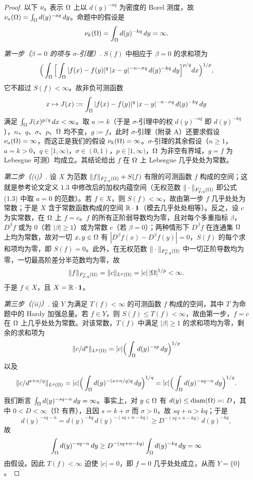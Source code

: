 \begin{proof}
以下 $\nu_{a}$ 表示 $\Omega$ 上以 $d(y)^{-aq}$ 为密度的 Borel 测度，故 $\nu_{a}(\Omega)=\int_\Omega d(y)^{-aq}\,dy$。命题中的假设是
\[
  \nu_k(\Omega)=\int_\Omega d(y)^{-kq}\,dy=\infty .
\]

\emph{第一步（$\beta=0$ 的项与 $\sigma$-引理）}. $S(f)$ 中相应于 $\beta=0$ 的求和项为
\[
  \Big(\int_\Omega\Big[\int_\Omega |f(x)-f(y)|^q\,|x-y|^{-n-\sigma q}\,d(y)^{-kq}\,dy\Big]^{p/q}dx\Big)^{1/p},
\]
它不超过 $S(f)<\infty$。故非负可测函数
\[
  x\mapsto J(x):=\int_\Omega |f(x)-f(y)|^q\,|x-y|^{-n-\sigma q}\,d(y)^{-kq}\,dy
\]
满足 $\int_\Omega J(x)^{p/q}\,dx<\infty$。取 $a:=k$（于是 $\sigma$-引理中的权 $d(y)^{-aq}$ 即 $d(y)^{-kq}$），$n$、$q$、$\sigma$、$p$、$\Omega$ 均不变，$g:=f$，此时 $\sigma$-引理（附录 A）还要求假设 $\nu_{a}(\Omega)=\infty$，而这正是我们的假设 $\nu_k(\Omega)=\infty$。$\sigma$-引理的其余假设（$n\ge1$，$a=k>0$，$q\in[1,\infty)$，$\sigma\in(0,1)$，$p\in[1,\infty)$，$\Omega$ 为非空有界域，$g=f$ 为 Lebesgue 可测）均成立。其结论给出 $f$ 在 $\Omega$ 上 Lebesgue 几乎处处为常数。

\emph{第二步（(i)）}. 设 $X$ 为范数 $\|f\|_{F^s_{p,q}(\Omega)}+S(f)$ 有限的可测函数 $f$ 构成的空间；这就是参考论文定义 1.3 中修改后的加权内蕴空间（无权范数 $\|\cdot\|_{F^s_{p,q}(\Omega)}$ 即公式 (1.3) 中取 $a=0$ 的范数）。若 $f\in X$，则 $S(f)<\infty$，故由第一步 $f$ 几乎处处为常数；于是 $X$ 含于常数函数构成的空间 $\mathbb{R}\cdot\mathbf{1}$（模去几乎处处相等）。反之，设 $c$ 为实常数，在 $\Omega$ 上 $f=c$。$f$ 的所有正阶弱导数均为零，且对每个多重指标 $\beta$，$D^\beta f$ 或为 $0$（若 $|\beta|\ge1$）或为常数 $c$（若 $\beta=0$）；两种情形下 $D^\beta f$ 在连通集 $\Omega$ 上均为常数，故对一切 $x,y\in\Omega$ 有 $|D^\beta f(x)-D^\beta f(y)|=0$，$S(f)$ 的每个求和项均为零，即 $S(f)=0$。此外，在无权范数 $\|\cdot\|_{F^s_{p,q}(\Omega)}$ 中一切正阶导数均为零，一切最高阶差分半范数均为零，故
\[
  \|f\|_{F^s_{p,q}(\Omega)}=\|c\|_{L^p(\Omega)}=|c|\,|\Omega|^{1/p}<\infty .
\]
于是 $f\in X$，且 $X=\mathbb{R}\cdot\mathbf{1}$。

\emph{第三步（(ii)）}. 设 $Y$ 为满足 $T(f)<\infty$ 的可测函数 $f$ 构成的空间，其中 $T$ 为命题中的 Hardy 加强总量。若 $f\in Y$，则 $S(f)\le T(f)<\infty$，故由第一步，$f=c$ 在 $\Omega$ 上几乎处处为常数。对该常数，$T(f)$ 中满足 $|\beta|\ge1$ 的求和项均为零，剩余的求和项为
\[
  \|c/d^{s}\|_{L^p(\Omega)}=|c|\Big(\int_\Omega d(y)^{-sp}\,dy\Big)^{1/p}
\]
以及
\[
  \|c/d^{s+n/q}\|_{L^q(\Omega)}
  =|c|\Big(\int_\Omega d(y)^{-(s+n/q)q}\,dy\Big)^{1/q}
  =|c|\Big(\int_\Omega d(y)^{-sq-n}\,dy\Big)^{1/q}.
\]
我们断言 $\int_\Omega d(y)^{-sq-n}\,dy=\infty$。事实上，对 $y\in\Omega$ 有 $d(y)\le\operatorname{diam}(\Omega)=:D$，其中 $0<D<\infty$（$\Omega$ 有界），且因 $s=k+\sigma$ 而 $\sigma>0$，故 $sq+n>kq$；于是
\[
  d(y)^{-sq-n}=d(y)^{-kq}\,d(y)^{-(sq+n-kq)}\ge D^{-(sq+n-kq)}\,d(y)^{-kq},
\]
故
\[
  \int_\Omega d(y)^{-sq-n}\,dy\ge D^{-(sq+n-kq)}\int_\Omega d(y)^{-kq}\,dy=\infty
\]
由假设。因此 $T(f)<\infty$ 迫使 $|c|=0$，即 $f=0$ 几乎处处成立，从而 $Y=\{0\}$。
\end{proof}

